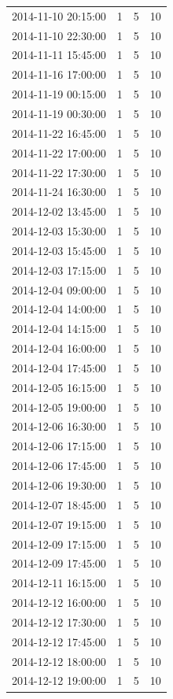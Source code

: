 \begin{tabular}{lrrr}
2014-11-10 20:15:00 & 1 & 5 & 10 \\
2014-11-10 22:30:00 & 1 & 5 & 10 \\
2014-11-11 15:45:00 & 1 & 5 & 10 \\
2014-11-16 17:00:00 & 1 & 5 & 10 \\
2014-11-19 00:15:00 & 1 & 5 & 10 \\
2014-11-19 00:30:00 & 1 & 5 & 10 \\
2014-11-22 16:45:00 & 1 & 5 & 10 \\
2014-11-22 17:00:00 & 1 & 5 & 10 \\
2014-11-22 17:30:00 & 1 & 5 & 10 \\
2014-11-24 16:30:00 & 1 & 5 & 10 \\
2014-12-02 13:45:00 & 1 & 5 & 10 \\
2014-12-03 15:30:00 & 1 & 5 & 10 \\
2014-12-03 15:45:00 & 1 & 5 & 10 \\
2014-12-03 17:15:00 & 1 & 5 & 10 \\
2014-12-04 09:00:00 & 1 & 5 & 10 \\
2014-12-04 14:00:00 & 1 & 5 & 10 \\
2014-12-04 14:15:00 & 1 & 5 & 10 \\
2014-12-04 16:00:00 & 1 & 5 & 10 \\
2014-12-04 17:45:00 & 1 & 5 & 10 \\
2014-12-05 16:15:00 & 1 & 5 & 10 \\
2014-12-05 19:00:00 & 1 & 5 & 10 \\
2014-12-06 16:30:00 & 1 & 5 & 10 \\
2014-12-06 17:15:00 & 1 & 5 & 10 \\
2014-12-06 17:45:00 & 1 & 5 & 10 \\
2014-12-06 19:30:00 & 1 & 5 & 10 \\
2014-12-07 18:45:00 & 1 & 5 & 10 \\
2014-12-07 19:15:00 & 1 & 5 & 10 \\
2014-12-09 17:15:00 & 1 & 5 & 10 \\
2014-12-09 17:45:00 & 1 & 5 & 10 \\
2014-12-11 16:15:00 & 1 & 5 & 10 \\
2014-12-12 16:00:00 & 1 & 5 & 10 \\
2014-12-12 17:30:00 & 1 & 5 & 10 \\
2014-12-12 17:45:00 & 1 & 5 & 10 \\
2014-12-12 18:00:00 & 1 & 5 & 10 \\
2014-12-12 19:00:00 & 1 & 5 & 10 \\

\end{tabular}
